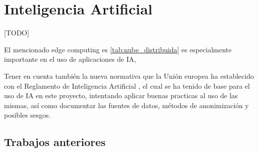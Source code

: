\section{Inteligencia Artificial}
\label{sec:EstudiosIA}

[TODO]


El mencionado edge computing es \ref{tab:nube_distribuida} es especialmente importante en el uso de aplicaciones de IA,

Tener en cuenta también la nueva normativa que la Unión europea ha establecido con el Reglamento de Inteligencia Artificial \citep{webRIA2024Europa}, el cual se ha tenido de base para el uso de IA en este proyecto, intentando aplicar buenas practicas al uso de las mismas, así como documentar las fuentes de datos, métodos de anonimización y posibles sesgos.
	
	\subsection{Trabajos anteriores}


